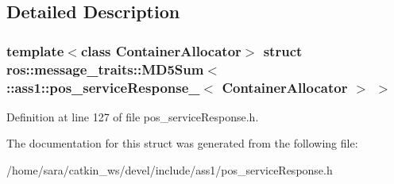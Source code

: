 \subsection{Detailed Description}
\subsubsection*{template$<$class Container\+Allocator$>$\newline
struct ros\+::message\+\_\+traits\+::\+M\+D5\+Sum$<$ \+::ass1\+::pos\+\_\+service\+Response\+\_\+$<$ Container\+Allocator $>$ $>$}



Definition at line 127 of file pos\+\_\+service\+Response.\+h.



The documentation for this struct was generated from the following file\+:\begin{DoxyCompactItemize}
\item 
/home/sara/catkin\+\_\+ws/devel/include/ass1/pos\+\_\+service\+Response.\+h\end{DoxyCompactItemize}
